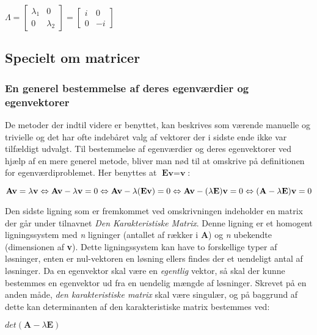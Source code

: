 \documentclass{article}
\newcommand{\cent}[1]{\begin{center}#1\end{center}}
\newcommand{\mat}[1]{\begin{equation}#1\end{equation}}
\newcommand{\smallMatrix}[4]{\ensuremath{\begin{bmatrix}
			#1 & #2 \\
			#3 & #4
\end{bmatrix}}}
\begin{document}
	\cent{$ \Lambda = \smallMatrix{\lambda_1}{0}{0}{\lambda_2} = \smallMatrix{i}{0}{0}{-i} $}
	
	
	
	\subsection{Specielt om matricer}
	\subsubsection{En generel bestemmelse af deres egenværdier og egenvektorer}
	
	De metoder der indtil videre er benyttet, kan beskrives som værende manuelle og trivielle og det har ofte indebåret valg af vektorer der i sidste ende ikke var tilfældigt udvalgt. Til bestemmelse af egenværdier og deres egenvektorer ved hjælp af en mere generel metode, bliver man nød til at omskrive på definitionen for egenværdiproblemet. Her benyttes at $ \textbf{Ev}=\textbf{v} $:
	
	\mat{\textbf{Av} = \lambda \textbf{v} 
		 \\ \Leftrightarrow  \\
		  \textbf{Av} - \lambda \textbf{v} = 0 
		  \\ \Leftrightarrow \\
	  		\textbf{Av} - \lambda (\textbf{Ev}) = 0 \\
	  		\Leftrightarrow \\
  				\textbf{Av} - (\lambda \textbf{E})\textbf{v} = 0 \\ 
  				\Leftrightarrow \\
  					(\textbf{A}-\lambda \textbf{E})\textbf{v}=0}
  	
  	Den sidste ligning som er fremkommet ved omskrivningen indeholder en matrix der går under tilnavnet \textit{Den Karakteristiske Matrix}. Denne ligning er et homogent ligningssystem med \textit{n} ligninger (antallet af rækker i \textbf{A}) og \textit{n} ubekendte (dimensionen af \textbf{v}). Dette ligningssystem kan have to forskellige typer af løsninger, enten er nul-vektoren en løsning ellers findes der et uendeligt antal af løsninger. Da en egenvektor skal være en \textit{egentlig} vektor, så skal der kunne bestemmes en egenvektor ud fra en uendelig mængde af løsninger. Skrevet på en anden måde, \textit{den karakteristiske matrix} skal være singulær, og på baggrund af dette kan determinanten af den karakteristiske matrix bestemmes ved:
  	
  	\cent{$ det(\textbf{A}-\lambda \textbf{E}) $}
  	
\end{document}
